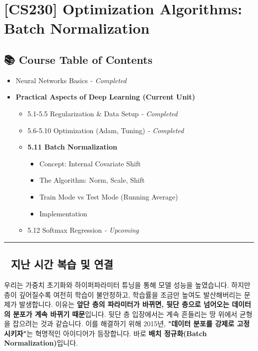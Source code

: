 \documentclass[11pt,a4paper]{book}
\theoremstyle{definition}
\begin{document}
\chapter{[CS230] Optimization Algorithms: \\ Batch Normalization}
\label{ch:lecture21}

\section*{📚 Course Table of Contents}
\begin{itemize}
    \item[Chapter 1-4.] Neural Networks Basics \textit{- Completed}
    \item[\textbf{Chapter 5.}] \textbf{Practical Aspects of Deep Learning (Current Unit)}
    \begin{itemize}
        \item 5.1-5.5 Regularization \& Data Setup \textit{- Completed}
        \item 5.6-5.10 Optimization (Adam, Tuning) \textit{- Completed}
        \item \textbf{5.11 Batch Normalization}
        \begin{itemize}
            \item Concept: Internal Covariate Shift
            \item The Algorithm: Norm, Scale, Shift
            \item Train Mode vs Test Mode (Running Average)
            \item Implementation
        \end{itemize}
        \item 5.12 Softmax Regression \textit{- Upcoming}
    \end{itemize}
\end{itemize}

\vspace{0.5cm}
\hrule
\vspace{0.5cm}

\section*{🔗 지난 시간 복습 및 연결}
우리는 가중치 초기화와 하이퍼파라미터 튜닝을 통해 모델 성능을 높였습니다. 하지만 층이 깊어질수록 여전히 학습이 불안정하고, 학습률을 조금만 높여도 발산해버리는 문제가 발생합니다.
이유는 \textbf{앞단 층의 파라미터가 바뀌면, 뒷단 층으로 넘어오는 데이터의 분포가 계속 바뀌기 때문}입니다. 뒷단 층 입장에서는 계속 흔들리는 땅 위에서 균형을 잡으려는 것과 같습니다.
이를 해결하기 위해 2015년, \textbf{"데이터 분포를 강제로 고정시키자"}는 혁명적인 아이디어가 등장합니다. 바로 \textbf{배치 정규화(Batch Normalization)}입니다.
\end{document}
